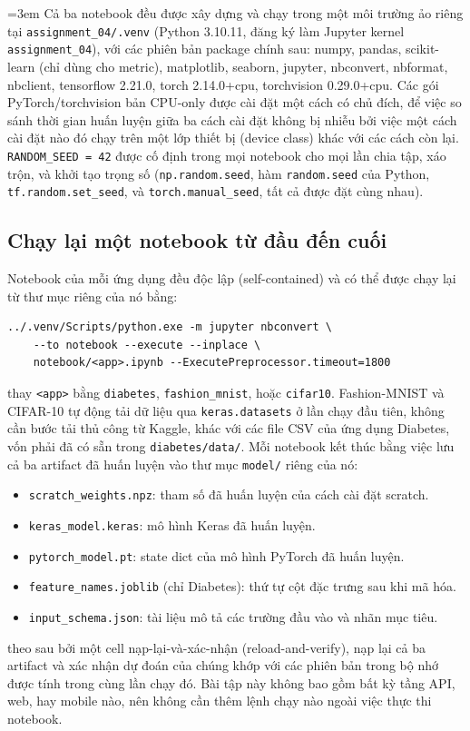 \documentclass[11pt]{article}
\newcommand{\code}[1]{\texttt{#1}}
\begin{document}
\begingroup\sloppy\emergencystretch=3em
Cả ba notebook đều được xây dựng và chạy trong một môi trường ảo riêng tại
\texttt{assignment\_04/.venv} (Python 3.10.11, đăng ký làm Jupyter kernel
\texttt{assignment\_04}), với các phiên bản package chính sau: numpy,
pandas, scikit-learn (chỉ dùng cho metric), matplotlib, seaborn, jupyter,
nbconvert, nbformat, nbclient, tensorflow 2.21.0, torch 2.14.0+cpu,
torchvision 0.29.0+cpu. Các gói PyTorch/torchvision bản CPU-only được cài
đặt một cách có chủ đích, để việc so sánh thời gian huấn luyện giữa ba
cách cài đặt không bị nhiễu bởi việc một cách cài đặt nào đó chạy trên một
lớp thiết bị (device class) khác với các cách còn lại.
\code{RANDOM\_SEED = 42} được cố định trong mọi notebook cho mọi lần chia
tập, xáo trộn, và khởi tạo trọng số (\code{np.random.seed}, hàm
\code{random.seed} của Python, \code{tf.random.set\_seed}, và
\code{torch.manual\_seed}, tất cả được đặt cùng nhau).
\par\endgroup

\subsection{Chạy lại một notebook từ đầu đến cuối}

Notebook của mỗi ứng dụng đều độc lập (self-contained) và có thể được chạy
lại từ thư mục riêng của nó bằng:
\begin{footnotesize}
\begin{verbatim}
../.venv/Scripts/python.exe -m jupyter nbconvert \
    --to notebook --execute --inplace \
    notebook/<app>.ipynb --ExecutePreprocessor.timeout=1800
\end{verbatim}
\end{footnotesize}
thay \texttt{<app>} bằng \texttt{diabetes}, \texttt{fashion\_mnist}, hoặc
\texttt{cifar10}. Fashion-MNIST và CIFAR-10 tự động tải dữ liệu qua
\code{keras.datasets} ở lần chạy đầu tiên, không cần bước tải thủ công từ
Kaggle, khác với các file CSV của ứng dụng Diabetes, vốn phải đã có sẵn
trong \texttt{diabetes/data/}. Mỗi notebook kết thúc bằng việc lưu cả ba
artifact đã huấn luyện vào thư mục \texttt{model/} riêng của nó:
\begin{itemize}[nosep]
  \item \texttt{scratch\_weights.npz}: tham số đã huấn luyện của cách cài
    đặt scratch.
  \item \texttt{keras\_model.keras}: mô hình Keras đã huấn luyện.
  \item \texttt{pytorch\_model.pt}: state dict của mô hình PyTorch đã
    huấn luyện.
  \item \texttt{feature\_names.joblib} (chỉ Diabetes): thứ tự cột đặc
    trưng sau khi mã hóa.
  \item \texttt{input\_schema.json}: tài liệu mô tả các trường đầu vào và
    nhãn mục tiêu.
\end{itemize}
theo sau bởi một cell nạp-lại-và-xác-nhận (reload-and-verify), nạp lại cả
ba artifact và xác nhận dự đoán của chúng khớp với các phiên bản trong bộ
nhớ được tính trong cùng lần chạy đó. Bài tập này không bao gồm bất kỳ
tầng API, web, hay mobile nào, nên không cần thêm lệnh chạy nào ngoài việc
thực thi notebook.
\end{document}
